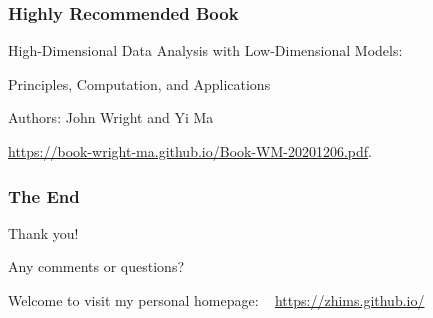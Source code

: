 \documentclass[aspectratio=2516]{beamer}
\begin{document}
\begin{frame}
\frametitle{Highly Recommended Book}
\begin{center}
	\color{magenta}
	
	High-Dimensional Data Analysis with Low-Dimensional Models: 
	
	\vspace{0.25cm}
	
	Principles, Computation, and Applications
	
	\vspace{0.55cm}
	
	Authors: John Wright and Yi Ma
	
	\vspace{0.5cm}
	
	{\color{blue}\tiny \url{https://book-wright-ma.github.io/Book-WM-20201206.pdf}}{\color{black}.}
\end{center}
\end{frame}





\begin{frame}
\frametitle{The End}
\begin{center}
	{\Huge Thank you!}
	
	\vspace{1cm}
	
	{\Huge Any comments or questions?}
	
	\vspace{2.25cm}	
	
  {\tiny Welcome to visit my personal homepage: \ {\color{blue} \url{https://zhims.github.io/}}}
\end{center}
\end{frame}
\end{document}
